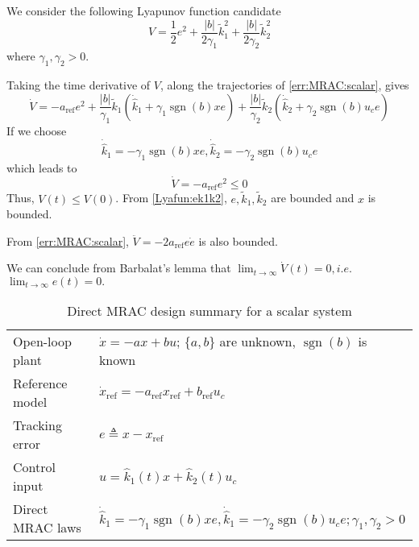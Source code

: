 We consider the following Lyapunov function candidate
\begin{equation}
  V = \frac{1}{2} e^2 + \frac{| b |}{2 \gamma_1} \tilde{k}^2_1 + \frac{| b
  |}{2 \gamma_2} \tilde{k}^2_2 \label{Lyafun:ek1k2}
\end{equation}
where $\gamma_1, \gamma_2 > 0$.

Taking the time derivative of $V$, along the trajectories of
\eqref{err:MRAC:scalar}, gives
\[ \dot{V} = - a_{\ensuremath{\operatorname{ref}}} e^2 + \frac{| b
   |}{\gamma_1} \widetilde{ k} _1 (\dot{\hat{k}}_1 + \gamma_1
   \ensuremath{\operatorname{sgn}} (b) x  e) + \frac{| b |}{\gamma_2}
   \tilde{k} _2 (\dot{\hat{k}}_2 + \gamma_2 \ensuremath{\operatorname{sgn}}
   (b)  u_c e) \]
If we choose
\begin{equation}
  \dot{\hat{k}}_1 = -  \gamma_1 \ensuremath{\operatorname{sgn}} (b) x  e,
  \dot{\hat{k}}_2 = -  \gamma_2 \ensuremath{\operatorname{sgn}} (b)  u_c e
\end{equation}
which leads to
\begin{equation}
  \dot{V} = - a_{\ensuremath{\operatorname{ref}}} e^2 \leq 0
\end{equation}
Thus, $V (t) \leq V (0)$. From \eqref{Lyafun:ek1k2}, $e, \tilde{k} _1,
\tilde{k} _2$ are bounded and $x$ is bounded.

From \eqref{err:MRAC:scalar}, $\ddot{V} = - 2
a_{\ensuremath{\operatorname{ref}}} e  \dot{e}$ is also bounded.

We can conclude from Barbalat's lemma that $\lim_{t \rightarrow \infty}
\dot{V} (t) = 0, i.e.$ $\lim_{t \rightarrow \infty} e (t) = 0.$

\begin{table}[h]
  \begin{tabular}{p{6.0cm}p{6.0cm}}
    \hline
    Open-loop plant & $\dot{x} = - a  x + b  u$; $\{ a, b \}$ are unknown,
    $\ensuremath{\operatorname{sgn}} (b)$ is known\\
    Reference model & $\dot{x}_{\ensuremath{\operatorname{ref}}} = -
    a_{\ensuremath{\operatorname{ref}}} x_{\ensuremath{\operatorname{ref}}} +
    b_{\ensuremath{\operatorname{ref}}} u_c$\\
    Tracking error & $e \triangleq x - x_{\ensuremath{\operatorname{ref}}}$\\
    Control input & $u = \hat{k}_1 (t) x + \hat{k}_2 (t) u_c$\\
    Direct MRAC laws & $\dot{\hat{k}}_1 = -  \gamma_1
    \ensuremath{\operatorname{sgn}} (b) x  e, \dot{\hat{k}}_1 = -  \gamma_2
    \ensuremath{\operatorname{sgn}} (b)  u_c e ; \gamma_1, \gamma_2 > 0$\\
    \hline
  \end{tabular}
  \caption{Direct MRAC design summary for a scalar system}
\end{table}


